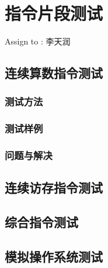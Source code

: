 \section{指令片段测试}
    Assign to : 李天润

    \subsection{连续算数指令测试}
        \subsubsection{测试方法}

        \subsubsection{测试样例}

        \subsubsection{问题与解决}

    \subsection{连续访存指令测试}

    \subsection{综合指令测试}

    \subsection{模拟操作系统测试}